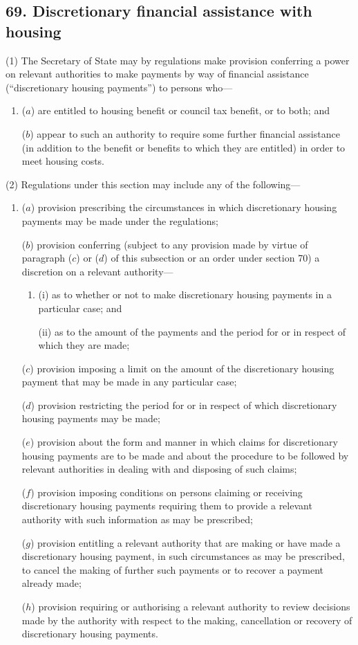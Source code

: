 \documentclass[12pt,a4paper]{article}
\begin{document}
\subsection{69. Discretionary financial assistance with housing}

(1) The Secretary of State may by regulations make provision conferring a power on relevant authorities to make payments by way of financial assistance (“discretionary housing payments”) to persons who—
\begin{enumerate}\item[]
($a$) are entitled to housing benefit or council tax benefit, or to both; and

($b$) appear to such an authority to require some further financial assistance (in addition to the benefit or benefits to which they are entitled) in order to meet housing costs.
\end{enumerate}

(2) Regulations under this section may include any of the following—
\begin{enumerate}\item[]
($a$) provision prescribing the circumstances in which discretionary housing payments may be made under the regulations;

($b$) provision conferring (subject to any provision made by virtue of paragraph ($c$)  or ($d$)  of this subsection or an order under section 70) a discretion on a relevant authority—
\begin{enumerate}\item[]
(i) as to whether or not to make discretionary housing payments in a particular case; and

(ii) as to the amount of the payments and the period for or in respect of which they are made;
\end{enumerate}

($c$) provision imposing a limit on the amount of the discretionary housing payment that may be made in any particular case;

($d$) provision restricting the period for or in respect of which discretionary housing payments may be made;

($e$) provision about the form and manner in which claims for discretionary housing payments are to be made and about the procedure to be followed by relevant authorities in dealing with and disposing of such claims;

($f$) provision imposing conditions on persons claiming or receiving discretionary housing payments requiring them to provide a relevant authority with such information as may be prescribed;

($g$) provision entitling a relevant authority that are making or have made a discretionary housing payment, in such circumstances as may be prescribed, to cancel the making of further such payments or to recover a payment already made;

($h$) provision requiring or authorising a relevant authority to review decisions made by the authority with respect to the making, cancellation or recovery of discretionary housing payments.
\end{enumerate}
\end{document}
